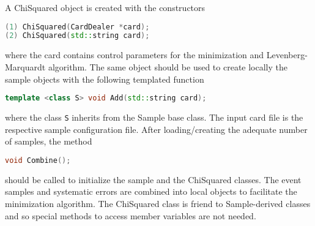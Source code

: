 \documentclass[a4paper, 11pt]{article}
\begin{document}
A ChiSquared object is created with the constructors
\begin{lstlisting}[language=C++]
(1) ChiSquared(CardDealer *card);
(2) ChiSquared(std::string card);
\end{lstlisting}
where the card contains control parameters for the minimization and Levenberg-Marquardt algorithm.
The same object should be used to create locally the sample objects with the following templated function
\begin{lstlisting}[language=C++]
    template <class S> void Add(std::string card);
\end{lstlisting}
where the class \texttt{S} inherits from the Sample base class.
The input card file is the respective sample configuration file.
After loading/creating the adequate number of samples, the method
\begin{lstlisting}[language=C++]
    void Combine();
\end{lstlisting}
should be called to initialize the sample and the ChiSquared classes.
The event samples and systematic errors are combined into local objects to facilitate the minimization algorithm.
The ChiSquared class is friend to Sample-derived classes and so special methods to access member variables are not needed.
\end{document}
